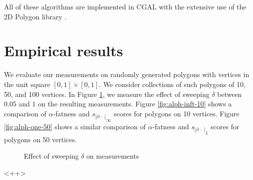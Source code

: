 \documentclass[]{jocg}
\newcommand{\abs}[1]{|#1|}
\newcommand{\chordarc}{s_{\abs{\partial~\cdot~}}}
\theoremstyle{definition}
\theoremstyle{remark}
\begin{document}
All of these algorithms are implemented in CGAL \cite{cgal:eb-18a} with the
extensive use of the 2D Polygon library \cite{cgal:gw-p2-18a}.


\section{Empirical results}


We evaluate our measurements on randomly generated polygons with vertices in the
unit square $[0,1] \times [0,1]$. We consider collections of such polygons of
10, 50, and 100 vertices. In Figure \ref{fig:delta}, we measure the effect of
sweeping $\delta$ between $0.05$ and $1$ on the resulting measurements. Figure
\ref{fig:alph-inft-10} shows a comparison of $\alpha$-fatness and
${\chordarc}_{\infty}$ scores for polygons on 10 vertices. Figure
\ref{fig:alph-one-50} shows a similar comparison of $\alpha$-fatness and
${\chordarc}_{1}$ scores for polygons on 50 vertices.

\begin{figure}[t]
  \centering
  \caption{Effect of sweeping $\delta$ on measurements}
  \label{fig:delta}
\end{figure}<++>
\end{document}
